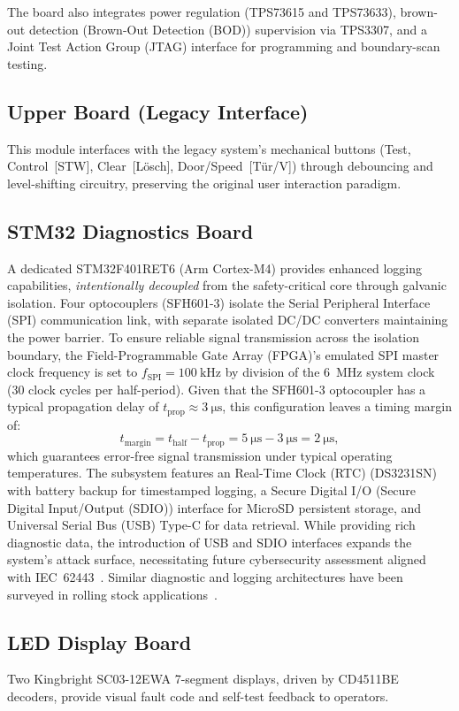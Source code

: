\documentclass[journal, a4paper]{IEEEtran}
\newif\iffirstFPGA  \firstFPGAtrue
\newcommand{\FPGA}{\iffirstFPGA Field-Programmable Gate Array (FPGA)\global\firstFPGAfalse\else FPGA\fi}
\newif\iffirstSPI   \firstSPItrue
\newcommand{\SPI}{\iffirstSPI Serial Peripheral Interface (SPI)\global\firstSPIfalse\else SPI\fi}
\newif\iffirstBOD   \firstBODtrue
\newcommand{\BOD}{\iffirstBOD Brown-Out Detection (BOD)\global\firstBODfalse\else BOD\fi}
\newif\iffirstSDIO  \firstSDIOtrue
\newcommand{\SDIO}{\iffirstSDIO Secure Digital Input/Output (SDIO)\global\firstSDIOfalse\else SDIO\fi}
\newif\iffirstRTC   \firstRTCtrue
\newcommand{\RTC}{\iffirstRTC Real-Time Clock (RTC)\global\firstRTCfalse\else RTC\fi}
\newif\iffirstJTAG  \firstJTAGtrue
\newcommand{\JTAG}{\iffirstJTAG Joint Test Action Group (JTAG)\global\firstJTAGfalse\else JTAG\fi}
\newif\iffirstUSB   \firstUSBtrue
\newcommand{\USB}{\iffirstUSB Universal Serial Bus (USB)\global\firstUSBfalse\else USB\fi}
\begin{document}
The board also integrates power regulation (TPS73615 and TPS73633), brown-out detection (\BOD{}) supervision via TPS3307, and a \JTAG{} interface for programming and boundary-scan testing.

\subsection{Upper Board (Legacy Interface)}
This module interfaces with the legacy system's mechanical buttons (Test, Control~[STW], Clear~[L\"osch], Door/Speed~[T\"ur/V]) through debouncing and level-shifting circuitry, preserving the original user interaction paradigm.

\subsection{STM32 Diagnostics Board}
A dedicated STM32F401RET6 (Arm Cortex-M4) provides enhanced logging capabilities, \textit{intentionally decoupled} from the safety-critical core through galvanic isolation. Four optocouplers (SFH601-3) isolate the \SPI{} communication link, with separate isolated DC/DC converters maintaining the power barrier. To ensure reliable signal transmission across the isolation boundary, the \FPGA{}'s emulated \SPI{} master clock frequency is set to $f_{\text{SPI}} = \SI{100}{\kilo\hertz}$ by division of the \SI{6}{\mega\hertz} system clock (30 clock cycles per half-period). Given that the SFH601-3 optocoupler has a typical propagation delay of $t_{\text{prop}} \approx \SI{3}{\micro\second}$, this configuration leaves a timing margin of:
\begin{equation}
  t_{\text{margin}} = t_{\text{half}} - t_{\text{prop}} = \SI{5}{\micro\second} - \SI{3}{\micro\second} = \SI{2}{\micro\second},
\end{equation}
which guarantees error-free signal transmission under typical operating temperatures. The subsystem features an \RTC{} (DS3231SN) with battery backup for timestamped logging, a Secure Digital I/O (\SDIO{}) interface for MicroSD persistent storage, and \USB{} Type-C for data retrieval. While providing rich diagnostic data, the introduction of \USB{} and \SDIO{} interfaces expands the system's attack surface, necessitating future cybersecurity assessment aligned with IEC~62443~\cite{iec62443_2013}. Similar diagnostic and logging architectures have been surveyed in rolling stock applications~\cite{chen2020diagnostics}.

\subsection{LED Display Board}
Two Kingbright SC03-12EWA 7-segment displays, driven by CD4511BE decoders, provide visual fault code and self-test feedback to operators.
\end{document}
